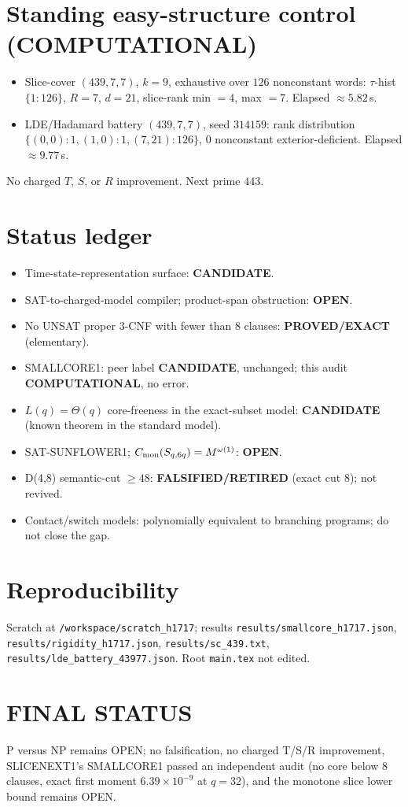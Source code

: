 \documentclass[11pt]{article}
\begin{document}
\section*{Standing easy-structure control (COMPUTATIONAL)}
\begin{itemize}
\item Slice-cover $(439,7,7)$, $k=9$, exhaustive over $126$ nonconstant words: $\tau$-hist $\{1{:}126\}$, $R=7$, $d=21$,
slice-rank min $=4$, max $=7$. Elapsed $\approx5.82$\,s.
\item LDE/Hadamard battery $(439,7,7)$, seed $314159$: rank distribution $\{(0,0){:}1,(1,0){:}1,(7,21){:}126\}$,
$0$ nonconstant exterior-deficient. Elapsed $\approx9.77$\,s.
\end{itemize}
No charged $T$, $S$, or $R$ improvement. Next prime $443$.

\section*{Status ledger}
\begin{itemize}
\item Time-state-representation surface: \textbf{CANDIDATE}.
\item SAT-to-charged-model compiler; product-span obstruction: \textbf{OPEN}.
\item No UNSAT proper 3-CNF with fewer than 8 clauses: \textbf{PROVED/EXACT} (elementary).
\item SMALLCORE1: peer label \textbf{CANDIDATE}, unchanged; this audit \textbf{COMPUTATIONAL}, no error.
\item $L(q)=\Theta(q)$ core-freeness in the exact-subset model: \textbf{CANDIDATE} (known theorem in the standard model).
\item SAT-SUNFLOWER1; $C_{\rm mon}(S_{q,6q})=M^{\omega(1)}$: \textbf{OPEN}.
\item D(4,8) semantic-cut $\ge48$: \textbf{FALSIFIED/RETIRED} (exact cut 8); not revived.
\item Contact/switch models: polynomially equivalent to branching programs; do not close the gap.
\end{itemize}

\section*{Reproducibility}
Scratch at \texttt{/workspace/scratch\_h1717}; results \texttt{results/smallcore\_h1717.json}, \texttt{results/rigidity\_h1717.json},
\texttt{results/sc\_439.txt}, \texttt{results/lde\_battery\_43977.json}. Root \texttt{main.tex} not edited.

\section*{FINAL STATUS}
P versus NP remains OPEN; no falsification, no charged T/S/R improvement, SLICENEXT1's SMALLCORE1 passed an independent audit
(no core below 8 clauses, exact first moment $6.39\times10^{-9}$ at $q=32$), and the monotone slice lower bound remains OPEN.
\end{document}
